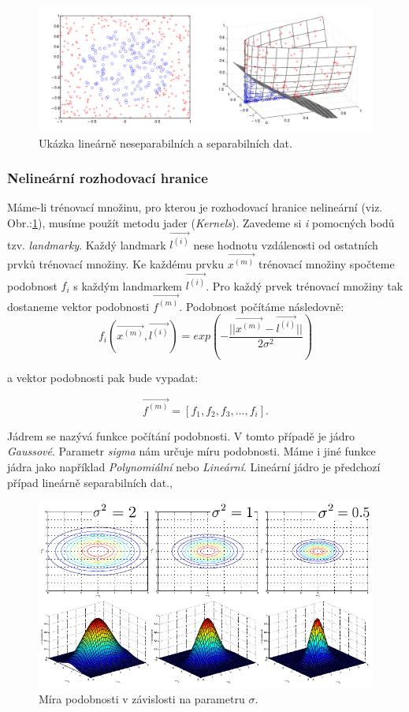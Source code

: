 \documentclass[a4]{article}
\begin{document}
\begin{figure}[!ht]
	\centering
		\includegraphics[width=\textwidth]{images/linear_nonlinear}
	\caption{Ukázka lineárně neseparabilních a separabilních dat.\cite{svm_wiki}}
	\label{fig:linear_nonlinear}
\end{figure}

\subsubsection{Nelineární rozhodovací hranice}
Máme-li trénovací množinu, pro kterou je rozhodovací hranice nelineární (viz. Obr.:\ref{fig:linear_nonlinear}), musíme použít metodu jader (\textit{Kernels}). Zavedeme si \textit{i} pomocných bodů tzv. \textit{landmarky}. Každý landmark $\vec{l^{(i)}}$ nese hodnotu vzdálenosti od ostatních prvků trénovací množiny. Ke každému prvku $\vec{x^{(m)}}$ trénovací množiny spočteme podobnost $f_{i}$ s každým landmarkem $\vec{l^{(i)}}$. Pro každý prvek trénovací množiny tak dostaneme vektor podobnosti $\vec{f^{(m)}}$. Podobnost počítáme následovně:
$$
f_{i}(\vec{x^{(m)}},\vec{l^{(i)}}) = exp(-\frac{||\vec{x^{(m)}} - \vec{l^{(i)}}||}{2\sigma^2})
$$

\noindent a vektor podobnosti pak bude vypadat:

$$\vec{f^{(m)}} = [f_{1},f_{2},f_{3},...,f_{i}].$$

\noindent Jádrem se nazývá funkce počítání podobnosti. V tomto případě je jádro \textit{Gaussové}. Parametr \textit{sigma} nám určuje míru podobnosti. Máme i jiné funkce jádra jako například \textit{Polynomiální} nebo \textit{Lineární}. Lineární jádro je předchozí případ lineárně separabilních dat.\cite{svm_robots},\cite{svm_wiki}

\begin{figure}[!ht]
	\centering
		\includegraphics[width=\textwidth]{images/sigma}
	\caption{Míra podobnosti v závislosti na parametru $\sigma$.\cite{svm_zcu}}
	\label{fig:sigma}
\end{figure}
\end{document}
